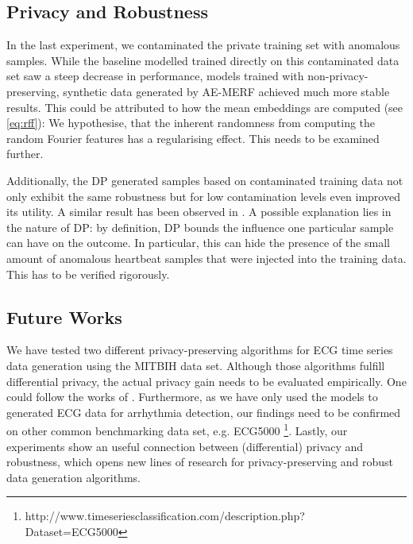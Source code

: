 \subsection{Privacy and Robustness}
In the last experiment, we contaminated the private training set with anomalous samples. While the baseline modelled trained directly on this contaminated data set saw a steep decrease in performance, models trained with non-privacy-preserving, synthetic data generated by AE-MERF achieved much more stable results. This could be attributed to how the mean embeddings are computed (see \cref{eq:rff}): We hypothesise, that the inherent randomness from computing the random Fourier features has a regularising effect. This needs to be examined further.

Additionally, the DP generated samples based on contaminated training data not only exhibit the same robustness but for low contamination levels even improved its utility. A similar result has been observed in \parencite{du2019robust}. A possible explanation lies in the nature of DP: by definition, DP bounds the influence one particular sample can have on the outcome. In particular, this can hide the presence of the small amount of anomalous heartbeat samples that were injected into the training data. This has to be verified rigorously.


\subsection{Future Works}

We have tested two different privacy-preserving algorithms for ECG time series data generation using the MITBIH data set. Although those algorithms fulfill differential privacy, the actual privacy gain needs to be evaluated empirically. One could follow the works of \parencite{adversay}. 
Furthermore, as we have only used the models to generated ECG data for arrhythmia detection, our findings need to be confirmed on other common benchmarking data set, e.g. ECG5000 \footnote{http://www.timeseriesclassification.com/description.php?Dataset=ECG5000}.
Lastly, our experiments show an useful connection between (differential) privacy and robustness, which opens new lines of research for privacy-preserving and robust data generation algorithms.

